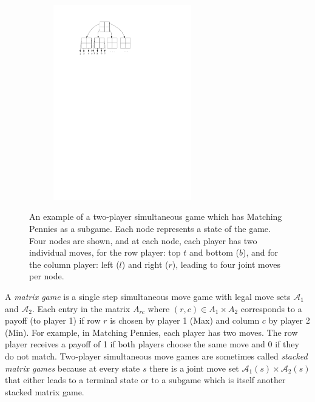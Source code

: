 \documentclass[conference]{IEEEtran}
\newcommand{\cA}{\mathcal{A}}
\begin{document}
\begin{figure}[t!]
\centering
\begin{subfigure}{6cm}
\centering
\includegraphics[width=6.0cm]{figures/tree2}\\
\end{subfigure}
\caption{An example of a two-player simultaneous game which has Matching Pennies as a subgame. Each node represents a state of 
the game. Four nodes are shown, and at each node, each player has two individual moves, for the row player: top $t$ and bottom ($b$), 
and for the column player: left ($l$) and right ($r$), leading to four joint moves per node.
\label{fig:example}}
\end{figure}

A {\it matrix game} is a single step simultaneous move game with legal move sets $\cA_1$ and $\cA_2$. 
Each entry in the matrix $A_{rc}$ where $(r,c) \in A_1 \times A_2$ corresponds to a payoff (to player 1) if row $r$ is chosen by 
player 1 (Max) and column $c$ by player 2 (Min). 
For example, in Matching Pennies, each player has two moves. The row player receives a payoff of 1 if both 
players choose the same move and 0 if they do not match. 
Two-player simultaneous move games are sometimes called {\it stacked matrix games} because at every state 
$s$ there is a joint move set $\cA_1(s) \times \cA_2(s)$ that either leads to a terminal state or to a subgame which 
is itself another stacked matrix game. 
\end{document}
